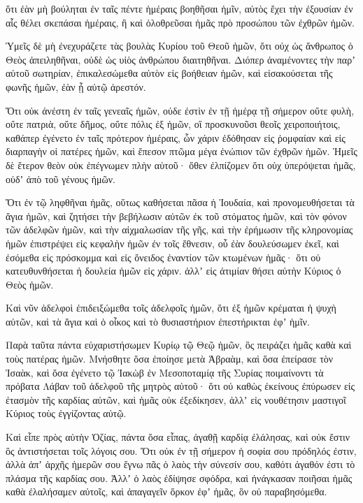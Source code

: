 {ὅτι ἐὰν μὴ βούληται ἐν ταῖς πέντε ἡμέραις βοηθῆσαι ἡμῖν, αὐτὸς ἔχει τὴν ἐξουσίαν ἐν αἷς θέλει σκεπάσαι ἡμέραις, ἢ καὶ ὀλοθρεῦσαι ἡμᾶς πρὸ προσώπου τῶν ἐχθρῶν ἡμῶν.
\par }{\PP {}Ὑμεῖς δὲ μὴ ἐνεχυράζετε τὰς βουλὰς Κυρίου τοῦ Θεοῦ ἡμῶν, ὅτι οὐχ ὡς ἄνθρωπος ὁ Θεὸς ἀπειληθῆναι, οὐδὲ ὡς υἱὸς ἀνθρώπου διαιτηθῆναι.
Διόπερ ἀναμένοντες τὴν παρʼ αὐτοῦ σωτηρίαν, ἐπικαλεσώμεθα αὐτὸν εἰς βοήθειαν ἡμῶν, καὶ εἰσακούσεται τῆς φωνῆς ἡμῶν, ἐὰν ᾖ αὐτῷ ἀρεστόν.
\par }{\PP {}Ὅτι οὐκ ἀνέστη ἐν ταῖς γενεαῖς ἡμῶν, οὐδε ἐστὶν ἐν τῇ ἡμέρᾳ τῇ σήμερον οὔτε φυλὴ, οὔτε πατριὰ, οὔτε δῆμος, οὔτε πόλις ἐξ ἡμῶν, οἳ προσκυνοῦσι θεοῖς χειροποιήτοις, καθάπερ ἐγένετο ἐν ταῖς πρότερον ἡμέραις,
ὧν χάριν ἐδόθησαν εἰς ῥομφαίαν καὶ εἰς διαρπαγὴν οἱ πατέρες ἡμῶν, καὶ ἔπεσον πτῶμα μέγα ἐνώπιον τῶν ἐχθρῶν ἡμῶν.
Ἡμεῖς δὲ ἕτερον θεὸν οὐκ ἐπέγνωμεν πλὴν αὐτοῦ· ὅθεν ἐλπίζομεν ὅτι οὐχ ὑπερόψεται ἡμᾶς, οὐδʼ ἀπὸ τοῦ γένους ἡμῶν.
\par }{\PP {}Ὅτι ἐν τῷ ληφθῆναι ἡμᾶς, οὕτως καθήσεται πᾶσα ἡ Ἰουδαία, καὶ προνομευθήσεται τὰ ἅγια ἡμῶν, καὶ ζητήσει τὴν βεβήλωσιν αὐτῶν ἐκ τοῦ στόματος ἡμῶν,
καὶ τὸν φόνον τῶν ἀδελφῶν ἡμῶν, καὶ τὴν αἰχμαλωσίαν τῆς γῆς, καὶ τὴν ἐρήμωσιν τῆς κληρονομίας ἡμῶν ἐπιστρέψει εἰς κεφαλὴν ἡμῶν ἐν τοῖς ἔθνεσιν, οὗ ἐὰν δουλεύσωμεν ἐκεῖ, καὶ ἐσόμεθα εἰς πρόσκομμα καὶ εἰς ὄνειδος ἐναντίον τῶν κτωμένων ἡμᾶς·
ὅτι οὐ κατευθυνθήσεται ἡ δουλεία ἡμῶν εἰς χάριν. ἀλλʼ εἰς ἀτιμίαν θήσει αὐτὴν Κύριος ὁ Θεὸς ἡμῶν.
\par }{\PP {}Καὶ νῦν ἀδελφοὶ ἐπιδειξώμεθα τοῖς ἀδελφοῖς ἡμῶν, ὅτι ἐξ ἡμῶν κρέμαται ἡ ψυχὴ αὐτῶν, καὶ τὰ ἅγια καὶ ὁ οἶκος καὶ τὸ θυσιαστήριον ἐπεστήρικται ἐφʼ ἡμῖν.
\par }{\PP {}Παρὰ ταῦτα πάντα εὐχαριστήσωμεν Κυρίῳ τῷ Θεῷ ἡμῶν, ὃς πειράζει ἡμᾶς καθὰ καὶ τοὺς πατέρας ἡμῶν.
Μνήσθητε ὅσα ἐποίησε μετὰ Ἁβραὰμ, καὶ ὅσα ἐπείρασε τὸν Ἰσαὰκ, καὶ ὅσα ἐγένετο τῷ Ἰακὼβ ἐν Μεσοποταμίᾳ τῆς Συρίας ποιμαίνοντι τὰ πρόβατα Λάβαν τοῦ ἀδελφοῦ τῆς μητρὸς αὐτοῦ·
ὅτι οὐ καθὼς ἐκείνους ἐπύρωσεν εἰς ἐτασμὸν τῆς καρδίας αὐτῶν, καὶ ἡμᾶς οὐκ ἐξεδίκησεν, ἀλλʼ εἰς νουθέτησιν μαστιγοῖ Κύριος τοὺς ἐγγίζοντας αὐτῷ.
\par }{\PP {}Καὶ εἶπε πρὸς αὐτὴν Ὀζίας, πάντα ὅσα εἶπας, ἀγαθῇ καρδίᾳ ἐλάλησας, καὶ οὐκ ἔστιν ὃς ἀντιστήσεται τοῖς λόγοις σου.
Ὅτι οὐκ ἐν τῇ σήμερον ἡ σοφία σου πρόδηλός ἐστιν, ἀλλὰ ἀπʼ ἀρχῆς ἡμερῶν σου ἔγνω πᾶς ὁ λαὸς τὴν σύνεσίν σου, καθότι ἀγαθόν ἐστι τὸ πλάσμα τῆς καρδίας σου.
Ἀλλʼ ὁ λαὸς ἐδίψησε σφόδρα, καὶ ἠνάγκασαν ποιῆσαι ἡμᾶς καθὰ ἐλαλήσαμεν αὐτοῖς, καὶ ἀπαγαγεῖν ὅρκον ἐφʼ ἡμᾶς, ὃν οὐ παραβησόμεθα.
}

